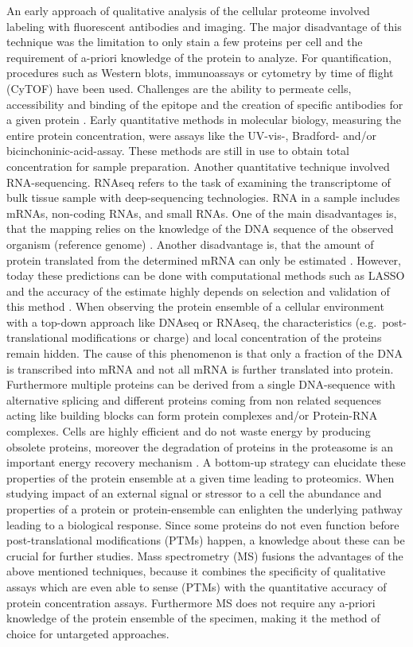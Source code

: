 \documentclass[
  11pt,
]{article}
\begin{document}
An early approach of qualitative analysis of the cellular proteome
involved labeling with fluorescent antibodies and imaging. The major
disadvantage of this technique was the limitation to only stain a few
proteins per cell and the requirement of a-priori knowledge of the
protein to analyze. For quantification, procedures such as Western
blots, immunoassays or cytometry by time of flight (CyTOF) have been
used. Challenges are the ability to permeate cells, accessibility and
binding of the epitope and the creation of specific antibodies for a
given protein \citep{Budnik2018}. Early quantitative methods in
molecular biology, measuring the entire protein concentration, were
assays like the UV-vis-, Bradford- and/or bicinchoninic-acid-assay.
These methods are still in use to obtain total concentration for sample
preparation. Another quantitative technique involved RNA-sequencing.
RNAseq refers to the task of examining the transcriptome of bulk tissue
sample with deep-sequencing technologies. RNA in a sample includes
mRNAs, non-coding RNAs, and small RNAs. One of the main disadvantages
is, that the mapping relies on the knowledge of the DNA sequence of the
observed organism (reference genome) \citep{Wang2009}. Another
disadvantage is, that the amount of protein translated from the
determined mRNA can only be estimated \citep{Gygi1999}. However, today
these predictions can be done with computational methods such as LASSO
and the accuracy of the estimate highly depends on selection and
validation of this method \citep{Magnusson2022}. When observing the
protein ensemble of a cellular environment with a top-down approach like
DNAseq or RNAseq, the characteristics (e.g.~post-translational
modifications or charge) and local concentration of the proteins remain
hidden. The cause of this phenomenon is that only a fraction of the DNA
is transcribed into mRNA and not all mRNA is further translated into
protein. Furthermore multiple proteins can be derived from a single
DNA-sequence with alternative splicing and different proteins coming
from non related sequences acting like building blocks can form protein
complexes and/or Protein-RNA complexes. Cells are highly efficient and
do not waste energy by producing obsolete proteins, moreover the
degradation of proteins in the proteasome is an important energy
recovery mechanism \citep{TANAKA2009}. A bottom-up strategy can
elucidate these properties of the protein ensemble at a given time
leading to proteomics. When studying impact of an external signal or
stressor to a cell the abundance and properties of a protein or
protein-ensemble can enlighten the underlying pathway leading to a
biological response. Since some proteins do not even function before
post-translational modifications (PTMs) happen, a knowledge about these
can be crucial for further studies. Mass spectrometry (MS) fusions the
advantages of the above mentioned techniques, because it combines the
specificity of qualitative assays which are even able to sense (PTMs)
with the quantitative accuracy of protein concentration assays.
Furthermore MS does not require any a-priori knowledge of the protein
ensemble of the specimen, making it the method of choice for untargeted
approaches.
\end{document}
